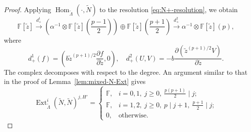 \documentclass[11pt,a4paper]{article} %
\def\FF{\mathbb{F}}
\def\Ext{\operatorname{Ext}} %
\def\Hom{\operatorname{Hom}}
\begin{document}
\begin{proof}
    Applying $\Hom_{\widetilde{\Lambda}}(\cdot,\widetilde{N})$ to the resolution \eqref{eq:N+-resolution}, we obtain
    \[
    \FF[\widetilde{z}]\xrightarrow{d^1_+}\left(\alpha^{-1}\otimes\FF[\widetilde{z}](\frac{p-1}{2})\right)\oplus\FF[\widetilde{z}](\frac{p+1}{2})\xrightarrow{d^2_+}\alpha^{-1}\otimes\FF[\widetilde{z}](p),
    \]
    where 
    \[
    d^1_+(f)=(b\widetilde{z}^{(p+1)/2}\frac{\partial f}{\partial\widetilde{z}},0),\quad d^2_+(U,V)=-b\frac{\partial(\widetilde{z}^{(p+1)/2}V)}{\partial\widetilde{z}}.
    \]
    The complex decomposes with respect to the degree. An argument similar to that in the proof of Lemma~\ref{lem:mixed-N-Ext} gives
    \[
    \Ext_{\widetilde{\Lambda}}^i(\widetilde{N},\widetilde{N})^{j,H'}=
         \begin{cases}
             \FF,&i=0,1,~j\ge0,~\frac{p(p+1)}{2}\mid j;\\
             \FF,&i=1,2,~j\ge0,~p\mid j+1,~\frac{p+1}{2}\mid j;\\
             0,&\text{otherwise}.            
         \end{cases}
    \]
    

\end{proof}
\end{document}
